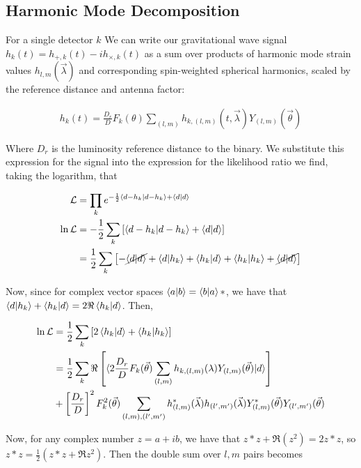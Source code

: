 \documentclass[paper=a4, fontsize=11pt]{scrartcl} %
\numberwithin{equation}{section} %
\numberwithin{figure}{section} %
\numberwithin{table}{section} %
\begin{document}
\subsection{Harmonic Mode Decomposition}

For a single detector $k$ We can write our gravitational wave signal $h_k(t) = h_{+,k}(t) - ih_{\times, k}(t)$ as a sum over products of harmonic mode strain values $h_{l,m}(\vec{\lambda})$ and corresponding spin-weighted spherical harmonics, scaled by the reference distance and antenna factor:

\begin{align}
h_k(t) = \frac{D_r}{D}F_k(\theta)\sum_{(l,m)}h_{k, (l,m)}(t, \vec{\lambda})Y_{(l,m)}(\vec{\theta})
\end{align}

Where $D_r$ is the luminosity reference distance to the binary. We substitute this expression for the signal into the expression for the likelihood ratio we find, taking the logarithm, that

\begin{align}
\mathcal{L} &= \prod_k e^{-\frac{1}{2}\braket{d - h_k|d-h_k} + \braket{d|d}} \\
\ln\mathcal{L} &= -\frac{1}{2}\sum_{k}\left[\braket{d - h_k|d-h_k} + \braket{d|d}\right] \\
&= \frac{1}{2}\sum_{k}\left[-\cancel{\braket{d|d}}+\braket{d|h_k}+\braket{h_k|d}+\braket{h_k|h_k} + \cancel{\braket{d|d}}\right] \\
\end{align}

Now, since for complex vector spaces $\braket{a|b} = \braket{b|a}*$, we have that $\braket{d|h_k} + \braket{h_k|d} = 2\Re\braket{h_k|d}$. Then, 

\begin{align}
\ln\mathcal{L} &= \frac{1}{2}\sum_{k}\left[2\braket{h_k|d} + \braket{h_k|h_k}\right] \\
&= \frac{1}{2} \sum_{k}\Re\left[\braket{2\frac{D_r}{D}F_k(\vec{\theta})\sum_{(l,m)}h_{k,(l,m)}(\lambda)Y_{(l,m)}(\vec{\theta})|d}\right] \\
&+ \left[\frac{D_r}{D}\right]^2F_k^2(\vec{\theta})\sum_{(l,m),(l',m')}h^*_{(l,m)}(\vec{\lambda})h_{(l',m')}(\vec{\lambda})Y^*_{(l,m)}(\vec{\theta})Y_{(l',m')}(\vec{\theta})
\end{align}  

Now, for any complex number $z = a + ib$, we have that $z*z + \Re(z^2) = 2z*z$, so $z*z = \frac{1}{2}(z*z + \Re z^2)$. Then the double sum over $l,m$ pairs becomes
\end{document}
